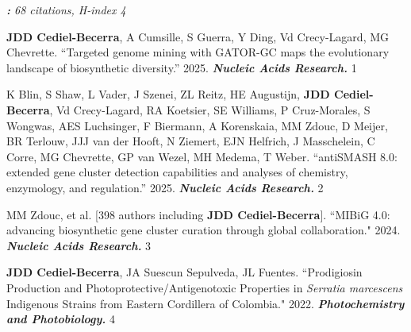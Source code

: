 
\textit{\textbf{:} 68 citations, H-index 4}

 \vspace{-2mm}

\begin{cvpubs}

\cvpub
{\textbf{JDD Cediel-Becerra}, A Cumsille, S Guerra, Y Ding, Vd Crecy-Lagard, MG Chevrette. ``Targeted genome mining with GATOR-GC maps the evolutionary landscape of biosynthetic diversity.'' 2025. \textit{\textbf{Nucleic Acids Research.}} \textit{\textbf{}}}
{1}

\cvpub
{K Blin, S Shaw, L Vader, J Szenei, ZL Reitz, HE Augustijn, \textbf{JDD Cediel-Becerra}, Vd Crecy-Lagard, RA Koetsier, SE Williams, P Cruz-Morales, S Wongwas, AES Luchsinger, F Biermann, A Korenskaia, MM Zdouc, D Meijer, BR Terlouw, JJJ van der Hooft, N Ziemert, EJN Helfrich, J Masschelein, C Corre, MG Chevrette, GP van Wezel, MH Medema, T Weber. ``antiSMASH 8.0: extended gene cluster detection capabilities and analyses of chemistry, enzymology, and regulation.'' 2025. \textit{\textbf{Nucleic Acids Research.}} \textit{\textbf{}}}
{2}

\cvpub
{MM Zdouc, et al. [398 authors including \textbf{JDD Cediel-Becerra}]. ``MIBiG 4.0: advancing biosynthetic gene cluster curation through global collaboration." 2024. \textit{\textbf{Nucleic Acids Research.}} \textit{\textbf{}}}
{3}

\cvpub
{\textbf{JDD Cediel-Becerra}, JA Suescun Sepulveda, JL Fuentes. ``Prodigiosin Production and Photoprotective/Antigenotoxic Properties in \textit{Serratia marcescens} Indigenous Strains from Eastern Cordillera of Colombia." 2022. \textit{\textbf{Photochemistry and Photobiology.}}\textit{\textbf{}}}
{4}
\end{cvpubs}


 \vspace{-2mm}

